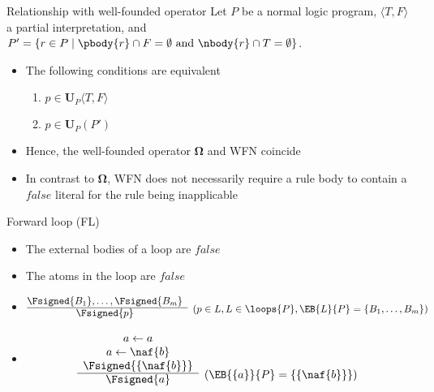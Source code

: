 \begin{frame}{Relationship with well-founded operator}
\bigskip
Let $P$ be a normal logic program,
$\langle T,F \rangle$ a partial interpretation, and\\
$P'=\{r\in P \mid \pbody{r}\cap F=\emptyset \text{ and } \nbody{r}\cap T=\emptyset\}$.\\
\bigskip
\begin{itemize}
\item <2-> The following conditions are equivalent
  \begin{enumerate}
  \item $p\in\mathbf{U}_P\langle T,F \rangle$
  \item $p\in\mathbf{U}_P(P')$
  \end{enumerate}
  \medskip
\item<3-> Hence, the well-founded operator $\mathbf{\Omega}$ and WFN coincide
\item<4->  In contrast to $\mathbf{\Omega}$, WFN does not necessarily require a rule
  body to contain a $\mathit{false}$ literal for the rule being inapplicable
\end{itemize}
\end{frame}
\begin{frame}{Forward loop (FL)}

\begin{itemize}
\item {} The external bodies of a loop are $\mathit{false}$
\item {} The atoms in the loop are $\mathit{false}$
\item {}
\[
\begin{array}{@{}cl}
\Fsigned{B_1},\dots,\Fsigned{B_m} &
\raisebox{-8pt}[0pt][0pt]{($p \in L, L \in \loops{P}, \EB{L}{P}=\{B_1,\dots,B_m\}$)}
\\\cline{1-1}
\Fsigned{p}
\end{array}
\]
\item<2-> 
\[
\begin{array}{cl}
a \leftarrow a \\
a \leftarrow \naf{b} \\
\Fsigned{\{\naf{b}\}} &
\raisebox{-8pt}[0pt][0pt]{($\EB{\{a\}}{P}=\{\{\naf{b}\}\}$)}
\\\cline{1-1}
\Fsigned{a}
\end{array}
\]
\end{itemize}
\end{frame}

